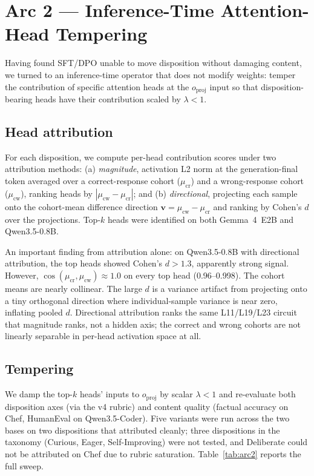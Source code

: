 \documentclass[11pt,a4paper]{article}
\begin{document}
\section{Arc 2 --- Inference-Time Attention-Head Tempering}

Having found SFT/DPO unable to move disposition without damaging content, we turned to an inference-time operator that does not modify weights: temper the contribution of specific attention heads at the $o_{\text{proj}}$ input so that disposition-bearing heads have their contribution scaled by $\lambda < 1$.

\subsection{Head attribution}

For each disposition, we compute per-head contribution scores under two attribution methods: (a) \emph{magnitude}, activation L2 norm at the generation-final token averaged over a correct-response cohort ($\mu_{\text{cr}}$) and a wrong-response cohort ($\mu_{\text{cw}}$), ranking heads by $|\mu_{\text{cw}} - \mu_{\text{cr}}|$; and (b) \emph{directional}, projecting each sample onto the cohort-mean difference direction $\mathbf{v} = \mu_{\text{cw}} - \mu_{\text{cr}}$ and ranking by Cohen's $d$ over the projections. Top-$k$ heads were identified on both Gemma~4~E2B and Qwen3.5-0.8B.

An important finding from attribution alone: on Qwen3.5-0.8B with directional attribution, the top heads showed Cohen's $d > 1.3$, apparently strong signal. However, $\cos(\mu_{\text{cr}}, \mu_{\text{cw}}) \approx 1.0$ on every top head (0.96--0.998). The cohort means are nearly collinear. The large $d$ is a variance artifact from projecting onto a tiny orthogonal direction where individual-sample variance is near zero, inflating pooled $d$. Directional attribution ranks the same L11/L19/L23 circuit that magnitude ranks, not a hidden axis; the correct and wrong cohorts are not linearly separable in per-head activation space at all.

\subsection{Tempering}

We damp the top-$k$ heads' inputs to $o_{\text{proj}}$ by scalar $\lambda < 1$ and re-evaluate both disposition axes (via the v4 rubric) and content quality (factual accuracy on Chef, HumanEval on Qwen3.5-Coder). Five variants were run across the two bases on two dispositions that attributed cleanly; three dispositions in the taxonomy (Curious, Eager, Self-Improving) were not tested, and Deliberate could not be attributed on Chef due to rubric saturation. Table~\ref{tab:arc2} reports the full sweep.
\end{document}
